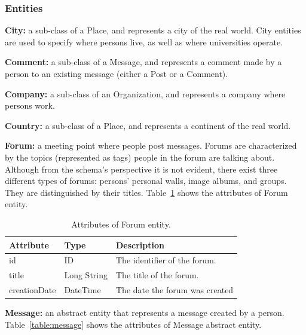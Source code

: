 \subsubsection{Entities}

{\flushleft \textbf{City:}} a sub-class of a Place, and represents a
city of the real world. City entities are used to specify where persons live,
as well as where universities operate.

{\flushleft \textbf{Comment:}} a sub-class of a Message, and represents a
comment made by a person to an existing message (either a Post or a Comment).

{\flushleft \textbf{Company:}} a sub-class of an Organization, and represents a company where persons work.


{\flushleft \textbf{Country:}} a sub-class of a Place, and represents a continent of the real world.


{\flushleft \textbf{Forum:}} a meeting point where people
post messages. Forums are characterized by the topics (represented as tags)
people in the forum are talking about. Although from the schema's perspective
it is not evident, there exist three different types of
forums: persons' personal walls, image albums, and groups. They are
distinguished by their titles. Table~\ref{table:forum} shows the attributes
of Forum entity.

\begin{table}[H]
    \begin{tabular}{|p{\attributecolumn}|p{\typecolumn}|p{\descriptioncolumn}|}
        \hline
        \textbf{Attribute} & \textbf{Type} & \textbf{Description} \\
        \hline
        id & ID  & The identifier of the forum.\\
        \hline
        title & Long String  & The title of the forum.\\
        \hline
        creationDate & DateTime  & The date the forum was created\\
        \hline
    \end{tabular}
    \caption{Attributes of Forum entity.}
    \label{table:forum}
\end{table}

{\flushleft \textbf{Message:}} an abstract entity that represents a message
created by a person. Table~\ref{table:message} shows the attributes of Message
abstract entity.

